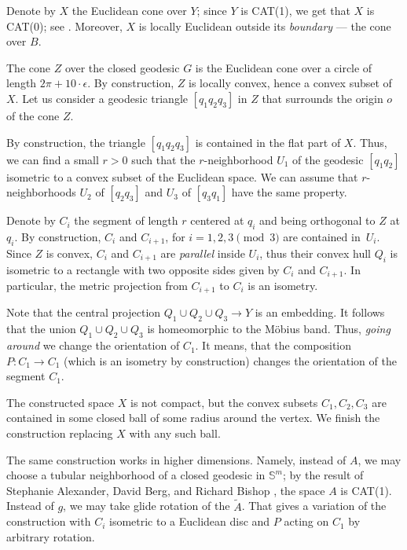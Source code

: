 \documentclass[a4paper,10pt]{article}
\begin{document}
Denote by $X$ the Euclidean cone over $Y$;
since $Y$ is CAT(1), we get that $X$ is CAT(0); see \cite{AKP}.
Moreover, $X$ is locally Euclidean outside its \emph{boundary} --- the cone over $B$.

The cone $Z$ over the closed geodesic $G$ is  the Euclidean cone over a circle of length $2\pi +10\cdot\epsilon$. By construction,
$Z$ is locally convex, hence a convex subset of~$X$.
Let us consider a geodesic triangle
$[q_1q_2q_3]$
in $Z$ that surrounds the origin $o$ of the cone $Z$.

By construction, the triangle $[q_1q_2q_3]$ is contained in the flat part of $X$.
Thus, we can find a small $r>0$ such that the $r$-neighborhood $U_1$ of the geodesic $[q_1q_2]$ isometric to a convex subset of the Euclidean space.
We can assume that $r$-neighborhoods $U_2$ of $[q_2q_3]$ and $U_3$ of $[q_3q_1]$ have the same property.

Denote by $C_i$ the segment of length $r$ centered at $q_i$ and being orthogonal to $Z$ at $q_i$.
By construction, $C_i$ and $C_{i+1}$, for $i=1,2,3\pmod 3$   are contained in~$U_i$.
Since $Z$ is convex, $C_i$ and $C_{i+1}$ are \emph{parallel} inside $U_i$, thus their convex hull  $Q_i$ is isometric to a rectangle with two opposite sides given by $C_i$ and $C_{i+1}$.
In particular, the metric projection from $C_{i+1}$ to $C_{i}$ is an isometry.

Note that the central projection $Q_1\cup Q_2\cup Q_3\to Y$ is an embedding.
It follows that the union $Q_1\cup Q_2\cup Q_3$ is homeomorphic to the Möbius band.
Thus, \emph{going around} we change the orientation of $C_1$.
It means, that the composition $P:C_1\to C_1$ (which is an isometry by construction) changes the orientation of the 
segment $C_1$.

The constructed space $X$ is not compact, but  the convex subsets $C_1,C_2,C_3$ are contained in some closed  ball of some radius around the vertex.  We finish the construction replacing $X$ with any such ball.\qeds

The same construction works in higher dimensions.
Namely, instead of $A$, we may choose a tubular neighborhood of a closed geodesic in $\mathbb{S}^m$;
by the result of Stephanie Alexander,  David Berg, and Richard Bishop \cite{ABB-1993}, the space $A$ is CAT(1).
Instead of $g$, we may take glide rotation of the $\tilde A$.
That gives a variation of the construction with $C_i$ isometric to a Euclidean disc and $P$ acting on $C_1$ by arbitrary rotation.

{\sloppy
\printbibliography[heading=bibintoc]
\fussy
}
\end{document}
